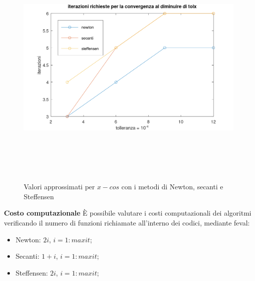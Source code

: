 \begin{figure}[!ht]
        \centering
        \includegraphics[width=16cm,height=12cm,keepaspectratio]{capitolo2/es6_figure.png}
        \caption{Valori approssimati per $x - cos$ con i metodi di Newton, secanti e Steffensen}
        \label{fig:es6}
\end{figure}
\FloatBarrier
\textbf{Costo computazionale}
È possibile valutare i costi computazionali dei algoritmi verificando il numero
di funzioni richiamate all'interno dei codici, mediante feval:
\begin{itemize}
        \item Newton: $2i$, $i=1:maxit$;
        \item Secanti: $1 + i$, $i=1:maxit$;
        \item Steffensen: $2i$, $i=1:maxit$;
\end{itemize}

